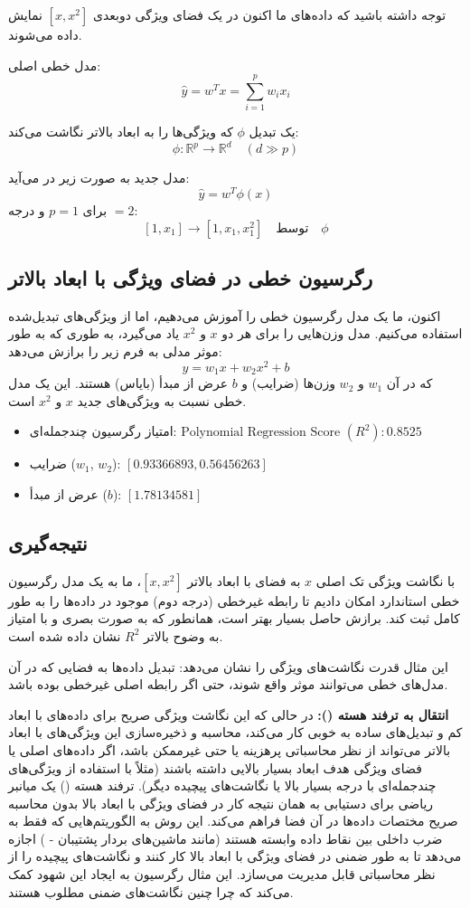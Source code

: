\documentclass{article}
\begin{document}
توجه داشته باشید که داده‌های ما اکنون در یک فضای ویژگی دو‌بعدی $[x, x^2]$ نمایش داده می‌شوند.

مدل خطی اصلی:
\[
\hat{y} = w^T x = \sum_{i=1}^{p} w_i x_i
\]

یک تبدیل $\phi$ که ویژگی‌ها را به ابعاد بالاتر نگاشت می‌کند:
\[
\phi: \mathbb{R}^p \to \mathbb{R}^d \quad (d \gg p)
\]

مدل جدید به صورت زیر در می‌آید:
\[
\hat{y} = w^T \phi(x)
\]
برای $p=1$ و درجه $=2$:
\[
[1, x_1] \to [1, x_1, x_1^2] \quad \text{توسط} \quad \phi
\]

\subsection*{رگرسیون خطی در فضای ویژگی با ابعاد بالاتر}
اکنون، ما یک مدل رگرسیون خطی را آموزش می‌دهیم، اما از ویژگی‌های تبدیل‌شده استفاده می‌کنیم. مدل وزن‌هایی را برای هر دو $x$ و $x^2$ یاد می‌گیرد، به طوری که به طور موثر مدلی به فرم زیر را برازش می‌دهد:
\[
y = w_1 x + w_2 x^2 + b
\]
که در آن $w_1$ و $w_2$ وزن‌ها (ضرایب) و $b$ عرض از مبدأ (بایاس) هستند. این یک مدل خطی نسبت به ویژگی‌های جدید $x$ و $x^2$ است.
\begin{itemize}
    \item امتیاز رگرسیون چندجمله‌ای: $\text{Polynomial Regression Score } (R^2): 0.8525$
    \item ضرایب ($w_1$, $w_2$): $[0.93366893, 0.56456263]$
    \item عرض از مبدأ ($b$): $[1.78134581]$
\end{itemize}

\subsection*{نتیجه‌گیری}
با نگاشت ویژگی تک اصلی $x$ به فضای با ابعاد بالاتر $[x, x^2]$، ما به یک مدل رگرسیون خطی استاندارد امکان دادیم تا رابطه غیرخطی (درجه دوم) موجود در داده‌ها را به طور کامل ثبت کند. برازش حاصل بسیار بهتر است، همانطور که به صورت بصری و با امتیاز به وضوح بالاتر $R^2$ نشان داده شده است.

این مثال قدرت نگاشت‌های ویژگی را نشان می‌دهد: تبدیل داده‌ها به فضایی که در آن مدل‌های خطی می‌توانند موثر واقع شوند، حتی اگر رابطه اصلی غیرخطی بوده باشد.

\textbf{انتقال به ترفند هسته ():} در حالی که این نگاشت ویژگی صریح برای داده‌های با ابعاد کم و تبدیل‌های ساده به خوبی کار می‌کند، محاسبه و ذخیره‌سازی این ویژگی‌های با ابعاد بالاتر می‌تواند از نظر محاسباتی پرهزینه یا حتی غیرممکن باشد، اگر داده‌های اصلی یا فضای ویژگی هدف ابعاد بسیار بالایی داشته باشند (مثلاً با استفاده از ویژگی‌های چندجمله‌ای با درجه بسیار بالا یا نگاشت‌های پیچیده دیگر). ترفند هسته () یک میانبر ریاضی برای دستیابی به همان نتیجه کار در فضای ویژگی با ابعاد بالا بدون محاسبه صریح مختصات داده‌ها در آن فضا فراهم می‌کند. این روش به الگوریتم‌هایی که فقط به ضرب داخلی بین نقاط داده وابسته هستند (مانند ماشین‌های بردار پشتیبان - ) اجازه می‌دهد تا به طور ضمنی در فضای ویژگی با ابعاد بالا کار کنند و نگاشت‌های پیچیده را از نظر محاسباتی قابل مدیریت می‌سازد. این مثال رگرسیون به ایجاد این شهود کمک می‌کند که چرا چنین نگاشت‌های ضمنی مطلوب هستند.
\end{document}
